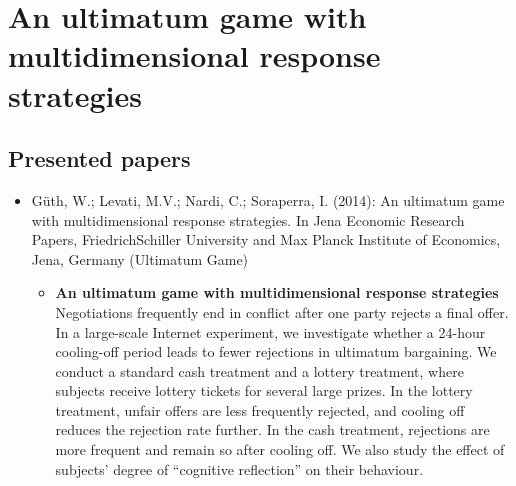 

\chapter{An ultimatum game with multidimensional response strategies} 

\section{Presented papers}


\begin{itemize}
	\item Güth, W.; Levati, M.V.; Nardi, C.; Soraperra, I. (2014): An ultimatum game with multidimensional response strategies. In Jena Economic Research Papers, FriedrichSchiller University and Max Planck Institute of Economics, Jena, Germany (Ultimatum Game)
		\begin{itemize}
			\item \textbf{An ultimatum game with multidimensional response strategies} \\
			Negotiations frequently end in conflict after one party rejects a final offer. In a large-scale Internet experiment, we investigate whether a 24-hour cooling-off period leads to fewer rejections in ultimatum bargaining. We conduct a standard cash treatment and a lottery treatment, where subjects receive lottery tickets for several large prizes. In the lottery treatment, unfair offers are less frequently rejected, and cooling off reduces the rejection rate further. In the cash treatment, rejections are more frequent and remain so after cooling off. We also study the effect of subjects’ degree of “cognitive reflection” on their behaviour.
		\end{itemize}
\end{itemize}


\newpage